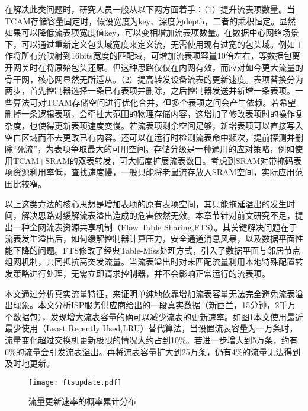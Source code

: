 在解决此类问题时，研究人员一般从以下两方面着手：（1）提升流表项数量。当TCAM存储容量固定时，假设宽度为key、深度为depth，二者的乘积恒定。显然如果可以降低流表项宽度值key，可以变相增加流表项数量。在数据中心网络场景下，可以通过重新定义包头域宽度来定义流，无需使用现有过宽的包头域。例如工作将所有流映射到16bits宽度的匹配域，可增加流表项容量10倍左右，等数据包离开网关时在将原始包头还原。但这种思路仅仅在内网有效，而应对如今更大流量的骨干网，核心网显然无所适从。（2）提高转发设备流表的更新速度。表项替换分为两步，首先控制器选择一条已有表项并删除，之后控制器发送并新增一条表项。一些算法可对TCAM存储空间进行优化合并，但多个表项之间会产生依赖。若希望删掉一条逻辑表项，会牵扯大范围的物理存储内容，这增加了修改表项时的操作复杂度，也使得更新表项速度变慢。若流表项剩余空间足够，新增表项可以直接写入空白区域而不去更改已有内容。还可以在运行时检测流表命中频次，提前探测并删除“死流”，为表项争取最大的可用空间。存储分级是一种通用的应对策略，例如使用TCAM+SRAM的双表转发，可大幅度扩展流表数目。考虑到SRAM对带掩码表项资源利用率低，查找速度慢，一般只能将老鼠流存放入SRAM空间，实际应用范围比较窄。

以上这类方法的核心思想是增加表项的原有表项空间，其只能拖延溢出的发生时间，解决思路对缓解流表溢出造成的危害依然无效。本章节针对前文研究不足，提出一种全网流表资源共享机制（Flow Table Sharing,FTS）。其关键解决问题在于流表发生溢出后，如何缓解控制器计算压力，安全通道消息风暴，以及数据平面性能下降的问题。FTS修改了经典Table-Miss处理方式，引入了数据平面与邻居节点组网机制，共同抵抗高突发流量。当流表溢出时对未匹配流量利用本地特殊配置转发策略进行处理，无需立即请求控制器，并不会影响正常运行的流表项。



\label{chap53}

本文通过分析真实流量特征，来证明单纯地依靠增加流表容量无法完全避免流表溢出现象。本文分析ISP服务供应商给出的一段真实数据（新西兰，15分钟，2千万个数据包），发现增大流表容量的确可以减少流表的更新速率。如图\ref{fig:ftsupdate}本文使用最近最少使用（Least Recently Used,LRU）替代算法，当设置流表容量为一万条时，流量变化超过交换机更新极限的情况大约占到10\%。若进一步增大到5万条，约有6\%的流量会引发流表溢出。再将流表容量扩大到25万条，仍有4\%的流量无法得到及时地更新。

\begin{figure}[!ht]
	\centering 
	\vspace{-1.5mm} 
	\texttt{[image: ftsupdate.pdf]}
	\caption{流量更新速率的概率累计分布} \label{fig:ftsupdate}
\end{figure}

